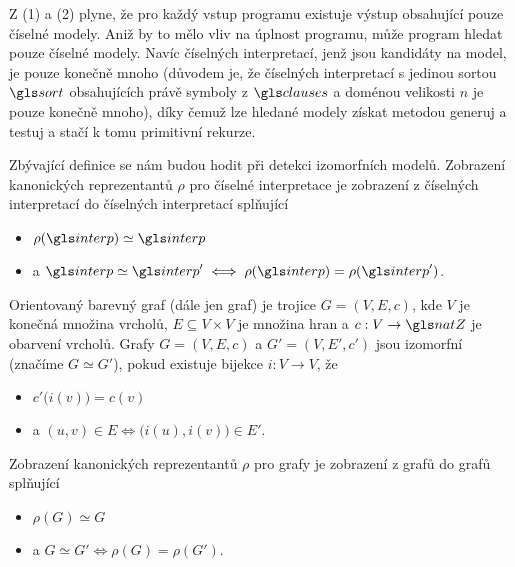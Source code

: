 Z (1) a (2) plyne, že pro každý vstup programu existuje výstup
obsahující pouze číselné modely. Aniž by to mělo vliv na úplnost
programu, může program hledat pouze číselné modely.
Navíc číselných interpretací, jenž jsou kandidáty na model,
je pouze konečně mnoho (důvodem je, že
číselných interpretací s jedinou sortou $\sort$ obsahujících právě symboly
z $\clauses$ a doménou velikosti $n$ je pouze konečně mnoho),
díky čemuž lze hledané
modely získat metodou generuj a testuj a stačí k tomu primitivní rekurze.

Zbývající definice se nám budou hodit při detekci izomorfních modelů.
Zobrazení kanonických reprezentantů $\rho$ pro číselné interpretace
je zobrazení z číselných interpretací do číselných interpretací splňující
\begin{itemize}
\item $\rho(\interp) \simeq \interp$
\item a $\interp \simeq \interp' \iff \rho(\interp) = \rho(\interp')$.
\end{itemize}

Orientovaný barevný graf (dále jen graf) je trojice $G = (V, E, c)$, kde
$V$ je konečná množina vrcholů, $E \subseteq V \times V$ je množina hran
a $c : V \to \natZ$ je obarvení vrcholů. Grafy
$G = (V, E, c)$ a $G' = (V, E', c')$ jsou izomorfní (značíme $G \simeq G'$),
pokud existuje bijekce $i : V \to V$, že
\begin{itemize}
\item $c'\bigl(i(v)\bigr) = c(v)$
\item a $(u, v) \in E \iff \bigl(i(u), i(v)\bigr) \in E'$.
\end{itemize}

Zobrazení kanonických reprezentantů $\rho$ pro grafy
je zobrazení z grafů do grafů splňující
\begin{itemize}
\item $\rho(G) \simeq G$
\item a $G \simeq G' \iff \rho(G) = \rho(G')$.
\end{itemize}


